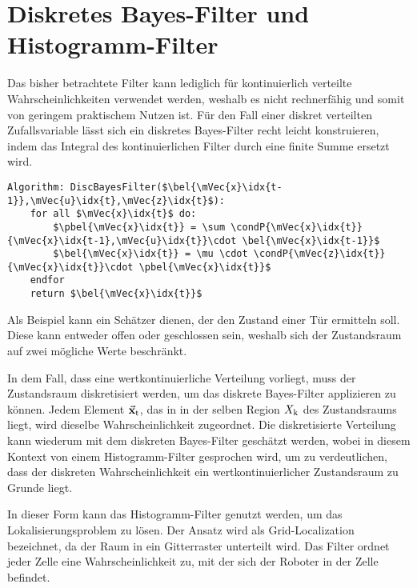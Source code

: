 \section{Diskretes Bayes-Filter und Histogramm-Filter}
Das bisher betrachtete Filter kann lediglich für kontinuierlich verteilte Wahrscheinlichkeiten verwendet werden, weshalb es nicht rechnerfähig und somit von geringem praktischem Nutzen ist. Für den Fall einer diskret verteilten Zufallsvariable lässt sich ein diskretes Bayes-Filter recht leicht konstruieren, indem das Integral des kontinuierlichen Filter durch eine finite Summe ersetzt wird.
\begin{lstlisting}[mathescape=true, caption={Diskretes Bayes-Filter},captionpos=b]
Algorithm: DiscBayesFilter($\bel{\mVec{x}\idx{t-1}},\mVec{u}\idx{t},\mVec{z}\idx{t}$):
	for all $\mVec{x}\idx{t}$ do:
		$\pbel{\mVec{x}\idx{t}} = \sum \condP{\mVec{x}\idx{t}}{\mVec{x}\idx{t-1},\mVec{u}\idx{t}}\cdot \bel{\mVec{x}\idx{t-1}}$
		$\bel{\mVec{x}\idx{t}} = \mu \cdot \condP{\mVec{z}\idx{t}}{\mVec{x}\idx{t}}\cdot \pbel{\mVec{x}\idx{t}}$
	endfor
	return $\bel{\mVec{x}\idx{t}}$
\end{lstlisting}
Als Beispiel kann ein Schätzer dienen, der den Zustand einer Tür ermitteln soll. Diese kann entweder offen oder geschlossen sein, weshalb sich der Zustandsraum auf zwei mögliche Werte beschränkt.

In dem Fall, dass eine wertkontinuierliche Verteilung vorliegt, muss der Zustandsraum diskretisiert werden, um das diskrete Bayes-Filter applizieren zu können. Jedem Element $\vec{\mathbf{x}}_{\text{t}}$, das in in der selben Region $X_{\text{k}}$ des Zustandsraums liegt, wird dieselbe Wahrscheinlichkeit zugeordnet. Die diskretisierte Verteilung kann wiederum mit dem diskreten Bayes-Filter geschätzt werden, wobei in diesem Kontext von einem Histogramm-Filter gesprochen wird, um zu verdeutlichen, dass der diskreten Wahrscheinlichkeit ein wertkontinuierlicher Zustandsraum zu Grunde liegt.

In dieser Form kann das Histogramm-Filter genutzt werden, um das Lokalisierungsproblem zu lösen. Der Ansatz wird als Grid-Localization bezeichnet, da der Raum in ein Gitterraster unterteilt wird. Das Filter ordnet jeder Zelle eine Wahrscheinlichkeit zu, mit der sich der Roboter in der Zelle befindet.